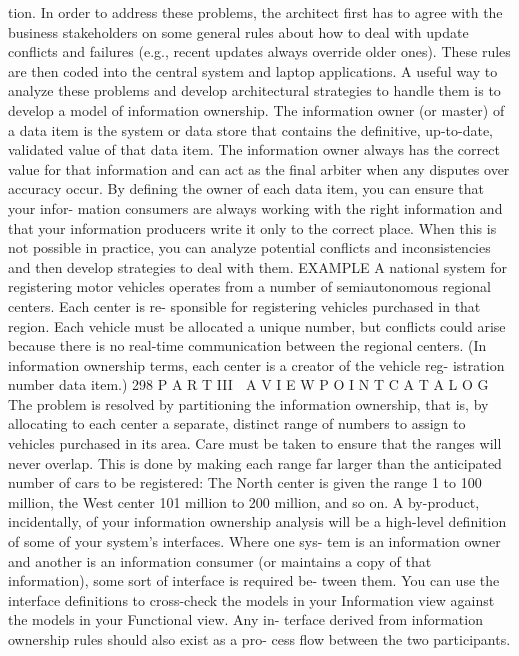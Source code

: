 tion.
In order to address these problems, the architect first has to agree
with the business stakeholders on some general rules about how to deal
with update conflicts and failures (e.g., recent updates always override
older ones). These rules are then coded into the central system and
laptop applications.
A useful way to analyze these problems and develop architectural strategies
to handle them is to develop a model of information ownership. The information
owner (or master) of a data item is the system or data store that contains the
definitive, up-to-date, validated value of that data item. The information owner
always has the correct value for that information and can act as the final arbiter
when any disputes over accuracy occur.
By defining the owner of each data item, you can ensure that your infor-
mation consumers are always working with the right information and that
your information producers write it only to the correct place. When this is not
possible in practice, you can analyze potential conflicts and inconsistencies
and then develop strategies to deal with them.
EXAMPLE A national system for registering motor vehicles operates
from a number of semiautonomous regional centers. Each center is re-
sponsible for registering vehicles purchased in that region. Each vehicle
must be allocated a unique number, but conflicts could arise because
there is no real-time communication between the regional centers. (In
information ownership terms, each center is a creator of the vehicle reg-
istration number data item.)
298
 P A R T III  A V I E W P O I N T C A T A L O G
The problem is resolved by partitioning the information ownership,
that is, by allocating to each center a separate, distinct range of numbers
to assign to vehicles purchased in its area. Care must be taken to ensure
that the ranges will never overlap. This is done by making each range far
larger than the anticipated number of cars to be registered: The North
center is given the range 1 to 100 million, the West center 101 million to
200 million, and so on.
A by-product, incidentally, of your information ownership analysis will
be a high-level definition of some of your system’s interfaces. Where one sys-
tem is an information owner and another is an information consumer (or
maintains a copy of that information), some sort of interface is required be-
tween them. You can use the interface definitions to cross-check the models
in your Information view against the models in your Functional view. Any in-
terface derived from information ownership rules should also exist as a pro-
cess flow between the two participants.
